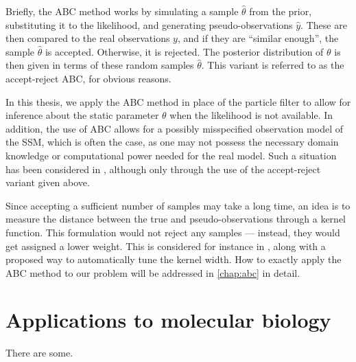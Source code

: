 Briefly, the ABC method works by simulating a sample $\hat{\theta}$ from the prior, substituting it to the likelihood, and generating pseudo-observations $\hat{y}$. These are then compared to the real observations $y$, and if they are ``similar enough'', the sample $\hat{\theta}$ is accepted. Otherwise, it is rejected. The posterior distribution of $\theta$ is then given in terms of these random samples $\hat{\theta}$. This variant is referred to as the accept-reject ABC, for obvious reasons.

In this thesis, we apply the ABC method in place of the particle filter to allow for inference about the static parameter $\theta$ when the likelihood is not available. In addition, the use of ABC allows for a possibly misspecified observation model of the SSM, which is often the case, as one may not possess the necessary domain knowledge or computational power needed for the real model. Such a situation has been considered in \cite{jasra-time-series}, although only through the use of the accept-reject variant given above.

Since accepting a sufficient number of samples may take a long time, an idea is to measure the distance between the true and pseudo-observations through a kernel function. This formulation would not reject any samples --- instead, they would get assigned a lower weight. This is considered for instance in \cite{dedecius}, along with a proposed way to automatically tune the kernel width. How to exactly apply the ABC method to our problem will be addressed in \autoref{chap:abc} in detail.

\section{Applications to molecular biology}
There are some.